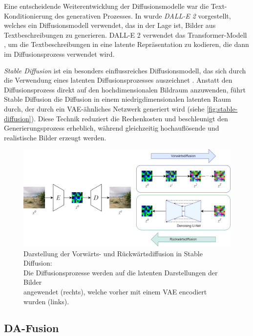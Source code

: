 Eine entscheidende Weiterentwicklung der Diffusionsmodelle war die Text-Konditionierung des generativen Prozesses. In \parencite{Ramesh2022dalle2} wurde \emph{DALL-E 2} vorgestellt, welches ein Diffusionsmodell verwendet, das in der Lage ist, Bilder aus Textbeschreibungen zu generieren. DALL-E 2 verwendet das Transformer-Modell \parencite{Vaswani2017transformer}, um die Textbeschreibungen in eine latente Repräsentation zu kodieren, die dann im Diffusionsprozess verwendet wird.

\emph{Stable Diffusion} ist ein besonders einflussreiches Diffusionsmodell, das sich durch die Verwendung eines latenten Diffusionsprozesses auszeichnet \parencite{Rombach2022stablediffusion}. Anstatt den Diffusionsprozess direkt auf den hochdimensionalen Bildraum anzuwenden, führt Stable Diffusion die Diffusion in einem niedrigdimensionalen latenten Raum durch, der durch ein VAE-ähnliches Netzwerk generiert wird (siehe \autoref{fig:stable-diffusion}). Diese Technik reduziert die Rechenkosten und beschleunigt den Generierungsprozess erheblich, während gleichzeitig hochauflösende und realistische Bilder erzeugt werden.

\begin{figure}[t]
	\centering
	\includegraphics[width=\textwidth]{images/figure_diffusion_merged_custom.png}
	\caption[Darstellung der Vorwärts- und Rückwärtsdiffusion in Stable Diffusion.]{Darstellung der Vorwärts- und Rückwärtsdiffusion in Stable Diffusion:\\
		Die	Diffusionsprozesse werden auf die latenten Darstellungen der Bilder\\
		angewendet (rechts), welche vorher mit einem VAE encodiert wurden (links).}
	\label{fig:stable-diffusion}
\end{figure}


\subsection{DA-Fusion} \label{subsec:da-fusion}

